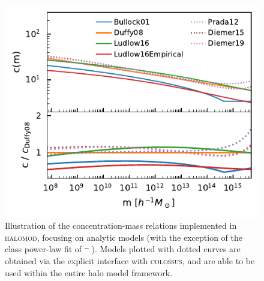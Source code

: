 \documentclass[5p,aas_macros]{elsarticle}
\newcommand{\halomod}{\textsc{halomod}\xspace} %
\newcommand{\bd}[1]{\textcolor{purple}{\textbf{[BD: #1]}}}
\newcommand{\sgm}[1]{\textcolor{green}{\textbf{[SM: #1]}}}
\providecommand{\DIFaddtex}[1]{{\protect\color{blue}\uwave{#1}}} %
\providecommand{\DIFdeltex}[1]{{\protect\color{red}\sout{#1}}}                      %
\providecommand{\DIFdelbegin}{} %
\providecommand{\DIFdelend}{} %
\providecommand{\DIFaddFL}[1]{\DIFadd{#1}} %
\providecommand{\DIFdelFL}[1]{\DIFdel{#1}} %
\providecommand{\DIFaddbeginFL}{} %
\providecommand{\DIFaddendFL}{} %
\providecommand{\DIFdelbeginFL}{} %
\providecommand{\DIFdelendFL}{} %
\providecommand{\DIFadd}[1]{\texorpdfstring{\DIFaddtex{#1}}{#1}} %
\providecommand{\DIFdel}[1]{\texorpdfstring{\DIFdeltex{#1}}{}} %
\begin{document}
\DIFdelend \begin{figure}
  \centering
  \includegraphics[width=\linewidth]{halo_concentration_models.pdf}
  \caption[Concentration-mass-redshift relation for various models in the literature]{Illustration of the concentration-mass relations implemented in \halomod, focusing on analytic models (with the exception of the class power-law fit of \DIFdelbeginFL \DIFdelFL{\mbox{%
\cite{Duffy2008}}\hspace{0pt}%
}\DIFdelendFL \DIFaddbeginFL \DIFaddFL{\mbox{%
\citealt{Duffy2008}}\hspace{0pt}%
}\DIFaddendFL ). Models plotted with dotted curves are obtained via the explicit interface with \textsc{colossus}, and are able to be used within the entire halo model framework. }
  \label{fig:concentration}
\end{figure}



\DIFdelbegin %

\end{document}
